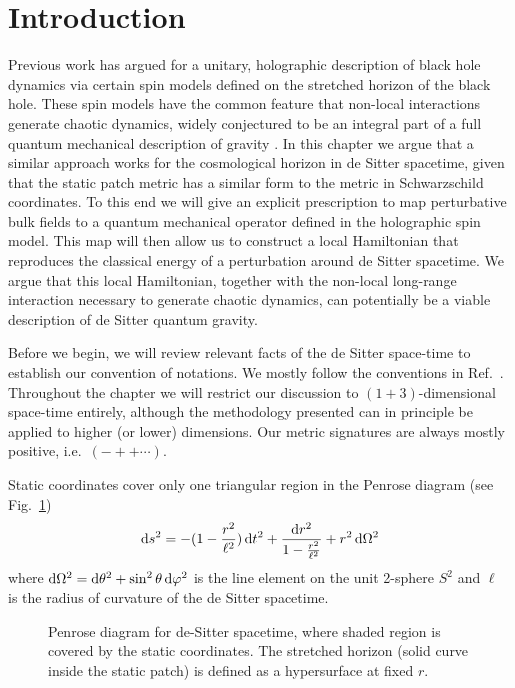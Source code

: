 \documentclass{brownthesis}
\def\dd{{\rm d}}
\begin{document}
\section{Introduction}

Previous work has argued for a unitary, holographic description of
black hole dynamics via certain spin models \cite{Lowe:2016mhi,Lowe:2017ehz}
defined on the stretched horizon \cite{thorne1986black} of the black
hole. These spin models have the common feature that non-local interactions
generate chaotic dynamics, widely conjectured to be an integral part
of a full quantum mechanical description of gravity \cite{Sekino:2008he}.
In this chapter we argue that a similar approach works for the cosmological
horizon in de Sitter spacetime, given that the static patch metric
has a similar form to the metric in Schwarzschild coordinates. To
this end we will give an explicit prescription to map perturbative
bulk fields to a quantum mechanical operator defined in the holographic
spin model. This map will then allow us to construct a local Hamiltonian
that reproduces the classical energy of a perturbation around de Sitter
spacetime. We argue that this local Hamiltonian, together with the
non-local long-range interaction necessary to generate chaotic dynamics,
can potentially be a viable description of de Sitter quantum gravity.

Before we begin, we will review relevant facts of the de Sitter space-time
to establish our convention of notations. We mostly follow the conventions
in Ref.~\cite{Spradlin:2001pw}. Throughout the chapter we will restrict
our discussion to $(1+3)$-dimensional space-time entirely, although
the methodology presented can in principle be applied to higher (or
lower) dimensions. Our metric signatures are always mostly positive,
i.e.~$(-++\cdots)$.

Static coordinates cover only one triangular region in the Penrose
diagram (see Fig.~\ref{penrose})
\begin{equation}
\dd s^{2}=-(1-\frac{r^{2}}{\ell^{2}})\,\dd t^{2}+\frac{\dd r^{2}}{1-\frac{r^{2}}{\ell^{2}}}+r^{2}\,\dd\Omega^{2}\label{eq:static}
\end{equation}
where $\dd\Omega^{2}=\dd\theta^{2}+\sin^{2}\theta\,\dd\varphi^{2}$
is the line element on the unit 2-sphere $S^{2}$ and $\ell$ is the
radius of curvature of the de Sitter spacetime.

\begin{figure}\centering
{} \caption{Penrose diagram for de-Sitter spacetime, where shaded region is covered
by the static coordinates. The stretched horizon (solid curve inside
the static patch) is defined as a hypersurface at fixed $r$.}
\label{penrose}
\end{figure}
\end{document}
